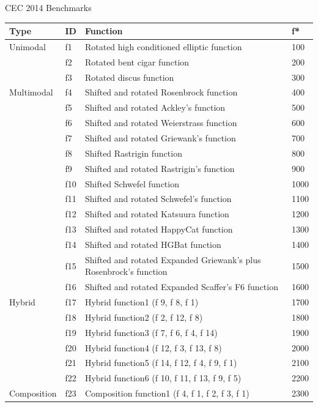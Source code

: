 \documentclass{beamer}
\begin{document}
\begin{frame}{CEC 2014 Benchmarks}
\begin{table}[]
\begin{tabular}{llll}
  \textbf{Type}
    & \textbf{ID} & \textbf{Function} & \textbf{f*} \\ \hline
  Unimodal
    & f1 & Rotated high conditioned elliptic function & 100 \\
    & f2 & Rotated bent cigar function & 200 \\
    & f3 & Rotated discus function & 300 \\
  Multimodal
    & f4 & Shifted and rotated Rosenbrock function & 400 \\
    & f5 & Shifted and rotated Ackley's function & 500 \\
    & f6 & Shifted and rotated Weierstrass function & 600 \\
    & f7 & Shifted and rotated Griewank's function & 700 \\
    & f8 & Shifted Rastrigin function & 800 \\
    & f9 & Shifted and rotated Rastrigin's function & 900 \\
    & f10 & Shifted Schwefel function & 1000 \\
    & f11 & Shifted and rotated Schwefel's function & 1100 \\
    & f12 & Shifted and rotated Katsuura function & 1200 \\
    & f13 & Shifted and rotated HappyCat function & 1300 \\
    & f14 & Shifted and rotated HGBat function & 1400 \\
    & f15 & Shifted and rotated Expanded Griewank's plus Rosenbrock's function & 1500 \\
    & f16 & Shifted and rotated Expanded Scaffer's F6 function & 1600 \\
  Hybrid
    & f17 & Hybrid function1 (f 9, f 8, f 1) & 1700 \\
    & f18 & Hybrid function2 (f 2, f 12, f 8) & 1800 \\
    & f19 & Hybrid function3 (f 7, f 6, f 4, f 14) & 1900 \\
    & f20 & Hybrid function4 (f 12, f 3, f 13, f 8) & 2000 \\
    & f21 & Hybrid function5 (f 14, f 12, f 4, f 9, f 1) & 2100 \\
    & f22 & Hybrid function6 (f 10, f 11, f 13, f 9, f 5) & 2200 \\
  Composition
    & f23 & Composition function1 (f 4, f 1, f 2, f 3, f 1) & 2300 \\

\end{tabular}
\end{table}
\end{frame}
\end{document}
